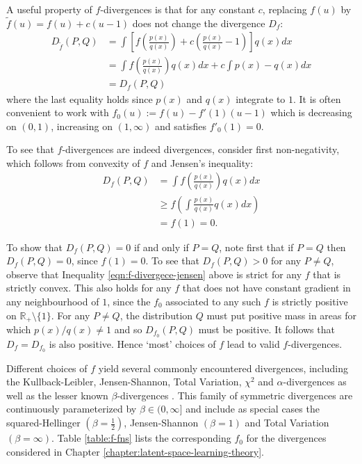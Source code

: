 A useful property of $f$-divergences is that for any constant $c$, replacing $f(u)$ by $\tilde{f}(u) = f(u) + c(u-1)$ does not change the divergence $D_f$:
%
\begin{align*}
D_{\tilde{f}}(P, Q) &= \int \left[ f\left(\frac{p(x)}{q(x)}\right) + c\left(\frac{p(x)}{q(x)} - 1\right) \right] q(x) dx \\
&=  \int f\left(\frac{p(x)}{q(x)}\right) q(x) dx + c \int p(x) - q(x) dx \\
&= D_f(P, Q)
\end{align*}
%
where the last equality holds since $p(x)$ and $q(x)$ integrate to $1$.
It is often convenient to work with $f_0(u) := f(u) - f'(1)(u-1)$ which is decreasing on $(0, 1)$, increasing on $(1, \infty)$ and satisfies $f'_0(1)=0$.


To see that $f$-divergences are indeed divergences, consider first non-negativity, which follows from convexity of $f$ and Jensen's inequality:
%
\begin{align}
D_f(P, Q) &= \int f\left(\frac{p(x)}{q(x)}\right) q(x) dx \nonumber \\ 
&\geq f\left(\int \frac{p(x)}{q(x)} q(x) dx\right) \label{eqn:f-divergece-jensen}\\
&= f(1) = 0. \nonumber
\end{align}
%

To show that $D_f(P,Q) = 0$ if and only if $P=Q$, note first that if $P=Q$ then $D_f(P,Q) = 0$, since $f(1)=0$.
To see that $D_f(P,Q) > 0$ for any $P \not= Q$, observe that Inequality \ref{eqn:f-divergece-jensen} above is strict for any $f$ that is strictly convex.
%
This also holds for any $f$ that does not have constant gradient in any neighbourhood of $1$, since the $f_0$ associated to any such $f$ is strictly positive on $\mathbb{R}_+\setminus \{1\}$.
For any $P\not= Q$, the distribution $Q$ must put positive mass in areas for which $p(x)/q(x) \not= 1$ and so  $D_{f_0}(P,Q)$ must be positive.
It follows that $D_f = D_{f_0}$ is also positive.
Hence `most' choices of $f$ lead to valid $f$-divergences.


Different choices of $f$ yield several commonly encountered divergences, including the Kullback-Leibler, Jensen-Shannon, Total Variation, $\chi^2$ and $\alpha$-divergences as well as the lesser known $\beta$-divergences \citep{osterreicher2003new}.
This family of symmetric divergences are continuously parameterized by $\beta\in(0, \infty]$ and include as special cases the squared-Hellinger $({\beta=\frac{1}{2}})$,  Jensen-Shannon $(\beta=1)$ and Total Variation $(\beta=\infty)$. 
Table \ref{table:f-fns} lists the corresponding $f_0$ for the divergences considered in Chapter \ref{chapter:latent-space-learning-theory}.


